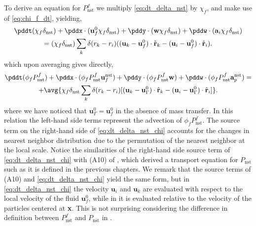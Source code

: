 To derive an equation for $P_\text{nst}^f$ we multiply \ref{eq:dt_delta_nst} by $\chi_f$, and make use of \ref{eq:chi_f_dt}, yielding, 
\begin{multline}
    \pddt (\chi_f\delta_\text{nst})
    +  \pddx \cdot (\textbf{u}_f^0 \chi_f\delta_\text{nst})
    +  \pddy \cdot (\textbf{w}    \chi_f\delta_\text{nst})
    +  \pddw \cdot   (\textbf{a}_i  \chi_f\delta_\text{nst})\\
    = 
    (\chi_f\delta_\text{nst})
    \sum_k 
    \delta(r_k - r_i)
    ((\textbf{u}_k - \textbf{u}_f^0) \cdot \hat{\textbf{r}}_k - (\textbf{u}_i  - \textbf{u}_f^0)\cdot \hat{\textbf{r}}_i). 
    \label{eq:dt_delta_nst_f}
\end{multline}
which upon averaging gives directly,
\begin{multline}
    \pddt (\phi_fP_\text{nst}^f)
    + 
    \pddx \cdot (
        \phi_f 
        P_\text{nst}^f
        \textbf{u}_f^\text{nst}
    )
    + \pddy \cdot (
        \phi_f
        P_\text{nst}^f
        \textbf{w} 
    )
    +
    \pddw \cdot (  
        \phi_f 
        P_\text{nst}^f
        \textbf{a}_p^\text{nst} 
    )
    = \\
    + \avg{
     \chi_f \delta_\text{nst}
    \sum_k 
    \delta(r_k - r_i)
    [(\textbf{u}_k - \textbf{u}_\Gamma^0) \cdot \hat{\textbf{r}}_k - (\textbf{u}_i- \textbf{u}_\Gamma^0)  \cdot \hat{\textbf{r}}_i]}.
    \label{eq:dt_P_nst_chi}
\end{multline}
where we have noticed that $\textbf{u}_\Gamma^0 = \textbf{u}_f^0$ in the absence of mass transfer. 
In this relation the left-hand side terms represent the advection of $\phi_f P_\text{nst}^f$.
The source term on the right-hand side of \ref{eq:dt_delta_nst_chi} accounts for the changes in nearest neighbor distribution due to the permutation of the nearest neighbor at the local scale. 
Notice the similarities of the right-hand side source term of \ref{eq:dt_delta_nst_chi} with (A10) of \citet{zhang2023evolution}, which derived a transport equation for $P_\text{nst}$ such as it is defined in the previous chapters. 
We remark that the source terms of (A10) and \ref{eq:dt_delta_nst_chi} yield the same form, but in \ref{eq:dt_delta_nst_chi} the velocity $\textbf{u}_i$ and $\textbf{u}_k$ are evaluated with respect to the local velocity of the fluid $\textbf{u}_f^0$, while in \citet{zhang2023evolution} it is evaluated relative to the velocity of the particles centered at \textbf{x}. 
This is not surprising considering the difference in definition between $P_\text{nst}^f$ and $P_\text{nst}$ in \citet{zhang2023evolution}. 


